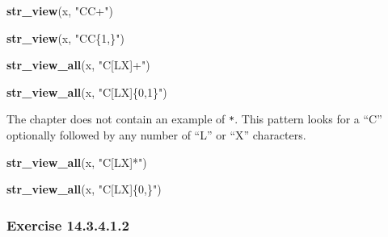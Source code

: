 \documentclass[]{book}
\newenvironment{Shaded}{\begin{snugshade}}{\end{snugshade}}
\newcommand{\KeywordTok}[1]{\textcolor[rgb]{0.13,0.29,0.53}{\textbf{#1}}}
\newcommand{\NormalTok}[1]{#1}
\newcommand{\StringTok}[1]{\textcolor[rgb]{0.31,0.60,0.02}{#1}}
\theoremstyle{plain}
\theoremstyle{remark}
\begin{document}
\begin{Shaded}
\begin{Highlighting}[]
\KeywordTok{str_view}\NormalTok{(x, }\StringTok{"CC+"}\NormalTok{)}
\end{Highlighting}
\end{Shaded}

\begin{Shaded}
\begin{Highlighting}[]
\KeywordTok{str_view}\NormalTok{(x, }\StringTok{"CC\{1,\}"}\NormalTok{)}
\end{Highlighting}
\end{Shaded}

\begin{Shaded}
\begin{Highlighting}[]
\KeywordTok{str_view_all}\NormalTok{(x, }\StringTok{"C[LX]+"}\NormalTok{)}
\end{Highlighting}
\end{Shaded}

\begin{Shaded}
\begin{Highlighting}[]
\KeywordTok{str_view_all}\NormalTok{(x, }\StringTok{"C[LX]\{0,1\}"}\NormalTok{)}
\end{Highlighting}
\end{Shaded}

The chapter does not contain an example of \texttt{*}.
This pattern looks for a ``C'' optionally followed by
any number of ``L'' or ``X'' characters.

\begin{Shaded}
\begin{Highlighting}[]
\KeywordTok{str_view_all}\NormalTok{(x, }\StringTok{"C[LX]*"}\NormalTok{)}
\end{Highlighting}
\end{Shaded}

\begin{Shaded}
\begin{Highlighting}[]
\KeywordTok{str_view_all}\NormalTok{(x, }\StringTok{"C[LX]\{0,\}"}\NormalTok{)}
\end{Highlighting}
\end{Shaded}

\hypertarget{exercise-14.3.4.1.2}{%
\subsubsection*{\texorpdfstring{Exercise {14.3.4.1.2}}{Exercise 14.3.4.1.2}}\label{exercise-14.3.4.1.2}}
\end{document}
